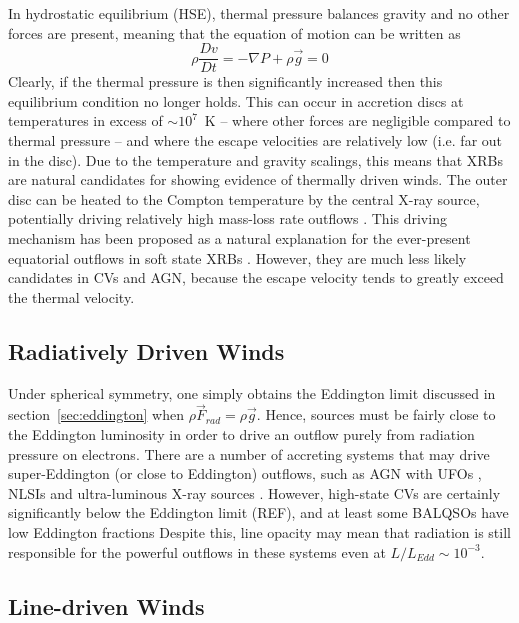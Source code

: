 In hydrostatic equilibrium (HSE), thermal pressure balances gravity and no other forces 
are present, meaning that the equation of motion can be written as 
\begin{equation}
\label{eq:hse}
\rho \frac{Dv}{Dt} = -\nabla P +  \rho \vec{g} = 0
\end{equation}
Clearly, if the thermal pressure is then significantly 
increased then this equilibrium condition no longer holds. 
This can occur in accretion discs at temperatures in excess of $\sim10^7$~K --
where other forces are negligible compared to thermal pressure -- 
and where the escape velocities are relatively low (i.e. far out in the disc).
Due to the temperature and gravity scalings, this means
that XRBs are natural candidates for showing evidence of thermally driven
winds. The outer disc can be heated to the Compton temperature by the central X-ray source,
potentially driving relatively high mass-loss rate outflows \citep{begelman1983,woods1996}. 
This driving mechanism has been proposed as a natural explanation
for the ever-present equatorial outflows in soft state XRBs \citep{ponti2012}.
However, they are much less likely candidates in CVs and AGN, because
the escape velocity tends to greatly exceed the thermal velocity.

\subsection{Radiatively Driven Winds}
\label{sec:rad_winds}

Under spherical symmetry, one simply obtains the Eddington limit discussed
in section~\ref{sec:eddington} when $\rho \vec{F}_{rad} = \rho \vec{g}$. 
Hence, sources must be fairly close to the Eddington luminosity in order 
to drive an outflow purely from radiation 
pressure on electrons. There are a number of accreting systems that may drive
super-Eddington (or close to Eddington) outflows, 
such as AGN with UFOs \citep[e.g.][]{reeves2002,pounds2016},
NLSIs \citep{done2015} and ultra-luminous X-ray sources \citep[ULXs;][]{walton2013}.
However, high-state CVs are certainly significantly below the Eddington limit (REF),
and at least some BALQSOs have low Eddington fractions \citep{grupenousek2015}
Despite this, line opacity may mean that radiation is still responsible for the 
powerful outflows in these systems even at $L / L_{Edd} \sim 10^{-3}$.

\subsection{Line-driven Winds}

